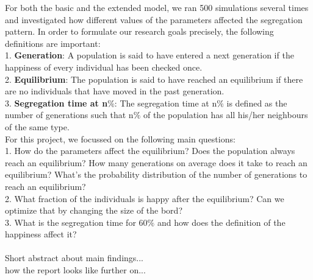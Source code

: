 For both the basic and the extended model, we ran 500 simulations several times and investigated how different values of the parameters affected the segregation pattern. 
In order to formulate our research goals precisely, the following definitions are important:\\
1. \textbf{Generation}: 
A population is said to have entered a next generation if the happiness of every individual has been checked once. \\
2. \textbf{Equilibrium}: 
The population is said to have reached an equilibrium if there are no individuals that have moved in the past generation.\\
3. \textbf{Segregation time at n$\%$}: 
The segregation time at n$\%$ is defined as the number of generations such that n$\%$ of the population has all his/her neighbours of the same type.\\

For this project, we focussed on the following main questions:\\
1. How do the parameters affect the equilibrium? 
Does the population always reach an equilibrium? 
How many generations on average does it take to reach an equilibrium? 
What's the probability distribution of the number of generations to reach an equilibrium?\\
2. What fraction of the individuals is happy after the equilibrium? 
Can we optimize that by changing the size of the bord?\\
3. What is the segregation time for 60$\%$ and how does the definition of the happiness affect it?\\
\\
Short abstract about main findings...\\
how the report looks like further on...